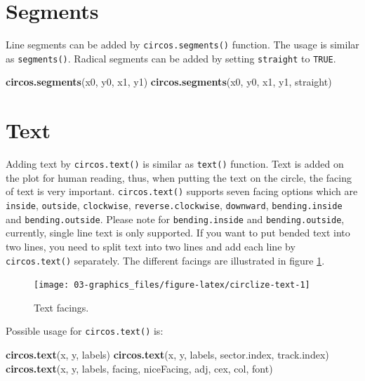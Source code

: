 \documentclass[]{book}
\newenvironment{Shaded}{\begin{snugshade}}{\end{snugshade}}
\newcommand{\KeywordTok}[1]{\textcolor[rgb]{0.13,0.29,0.53}{\textbf{#1}}}
\newcommand{\NormalTok}[1]{#1}
\theoremstyle{definition}
\theoremstyle{definition}
\theoremstyle{remark}
\begin{document}
\section{Segments}\label{segments}

Line segments can be added by \texttt{circos.segments()} function. The
usage is similar as \texttt{segments()}. Radical segments can be added
by setting \texttt{straight} to \texttt{TRUE}.

\begin{Shaded}
\begin{Highlighting}[]
\KeywordTok{circos.segments}\NormalTok{(x0, y0, x1, y1)}
\KeywordTok{circos.segments}\NormalTok{(x0, y0, x1, y1, straight)}
\end{Highlighting}
\end{Shaded}

\section{Text}\label{text}

Adding text by \texttt{circos.text()} is similar as \texttt{text()}
function. Text is added on the plot for human reading, thus, when
putting the text on the circle, the facing of text is very important.
\texttt{circos.text()} supports seven facing options which are
\texttt{inside}, \texttt{outside}, \texttt{clockwise},
\texttt{reverse.clockwise}, \texttt{downward}, \texttt{bending.inside}
and \texttt{bending.outside}. Please note for \texttt{bending.inside}
and \texttt{bending.outside}, currently, single line text is only
supported. If you want to put bended text into two lines, you need to
split text into two lines and add each line by \texttt{circos.text()}
separately. The different facings are illustrated in figure
\ref{fig:circlize-text}.

\begin{figure}

{\centering \texttt{[image: 03-graphics\_files/figure-latex/circlize-text-1]} 

}

\caption{Text facings.}\label{fig:circlize-text}
\end{figure}

Possible usage for \texttt{circos.text()} is:

\begin{Shaded}
\begin{Highlighting}[]
\KeywordTok{circos.text}\NormalTok{(x, y, labels)}
\KeywordTok{circos.text}\NormalTok{(x, y, labels, sector.index, track.index)}
\KeywordTok{circos.text}\NormalTok{(x, y, labels, facing, niceFacing, adj, cex, col, font)}
\end{Highlighting}
\end{Shaded}
\end{document}
